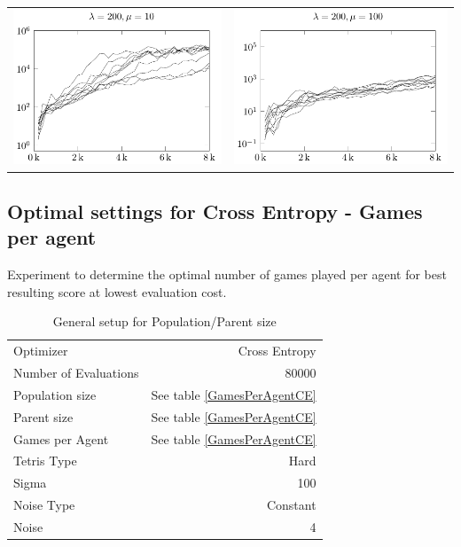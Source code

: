 \begin{tabular}{@{}l@{}l@{}}
\includegraphics[scale=1]{plots/ce_ConstantNoise_l200_o20_all} &
\includegraphics[scale=1]{plots/ce_ConstantNoise_l200_o100_all}
\end{tabular}


\clearpage

\subsection{Optimal settings for Cross Entropy - Games per agent \label{appendixCEPopulationParent}}
Experiment to determine the optimal number of games played per agent for best resulting score at lowest evaluation cost.

\begin{table}[h]
\centering
\caption{General setup for Population/Parent size}
\begin{tabular}{l r}
Optimizer & Cross Entropy\\
Number of Evaluations & 80000\\
Population size & See table \ref{GamesPerAgentCE}\\
Parent size & See table \ref{GamesPerAgentCE}\\
Games per Agent & See table \ref{GamesPerAgentCE}\\
Tetris Type & Hard\\
\hline
Sigma & 100\\
Noise Type & Constant\\
Noise & 4
\end{tabular}
\end{table}

